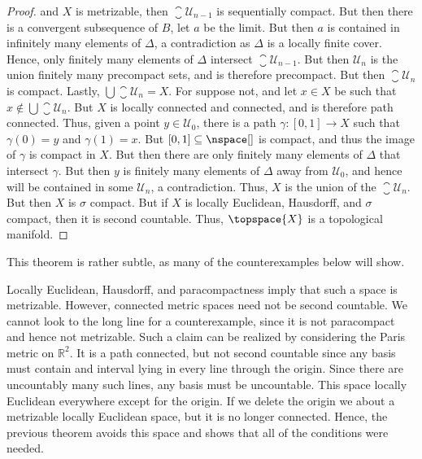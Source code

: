 \begin{proof}
                and $X$ is metrizable, then $\closure{\mathcal{U}_{n-1}}$
                is sequentially compact. But then there is a convergent
                subsequence of $B$, let $a$ be the limit. But then $a$ is
                contained in infinitely many elements of $\Delta$, a
                contradiction as $\Delta$ is a locally finite cover. Hence,
                only finitely many elements of $\Delta$ intersect
                $\closure{\mathcal{U}_{n-1}}$. But then
                $\mathcal{U}_{n}$ is the union finitely many precompact sets,
                and is therefore precompact. But then
                $\closure{\mathcal{U}_{n}}$ is compact. Lastly,
                $\bigcup\closure{\mathcal{U}_{n}}=X$. For suppose not, and let
                $x\in{X}$ be such that
                $x\notin\bigcup\closure{\mathcal{U}_{n}}$. But $X$ is locally
                connected and connected, and is therefore path connected. Thus,
                given a point $y\in\mathcal{U}_{0}$, there is a path
                $\gamma:[0,1]\rightarrow{X}$ such that $\gamma(0)=y$ and
                $\gamma(1)=x$. But $[0,1]\subseteq\nspace[]$ is compact, and
                thus the image of $\gamma$ is compact in $X$. But then there are
                only finitely many elements of $\Delta$ that intersect
                $\gamma$. But then $y$ is finitely many elements of $\Delta$
                away from $\mathcal{U}_{0}$, and hence will be contained in
                some $\mathcal{U}_{n}$, a contradiction. Thus, $X$ is the union
                of the $\closure{\mathcal{U}_{n}}$. But then $X$ is
                $\sigma$ compact. But if $X$ is locally Euclidean, Hausdorff,
                and $\sigma$ compact, then it is second countable. Thus,
                $\topspace{X}$ is a topological manifold.
            \end{proof}
            This theorem is rather subtle, as many of the counterexamples below
            will show.
            \begin{example}
                Locally Euclidean, Hausdorff, and paracompactness imply that
                such a space is metrizable. However, connected metric spaces
                need not be second countable. We cannot look to the long line
                for a counterexample, since it is not paracompact and hence not
                metrizable. Such a claim can be realized by considering the
                Paris metric on $\mathbb{R}^{2}$. It is a path connected,
                but not second countable since any basis must contain and
                interval lying in every line through the origin. Since there are
                uncountably many such lines, any basis must be uncountable. This
                space locally Euclidean everywhere except for the origin. If we
                delete the origin we about a metrizable locally Euclidean space,
                but it is no longer connected. Hence, the previous theorem
                avoids this space and shows that all of the conditions were
                needed.
            \end{example}
